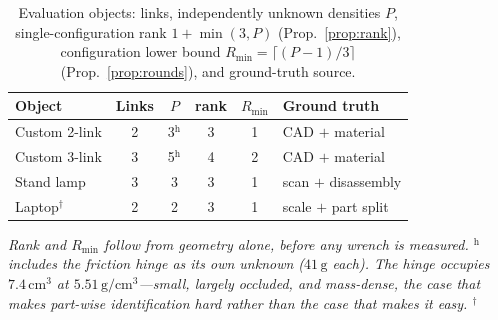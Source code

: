 \begin{table}[t]
\caption{Evaluation objects: links, independently unknown densities $P$,
single-configuration rank $1+\min(3,P)$ (Prop.~\ref{prop:rank}), configuration
lower bound $R_{\min}=\lceil (P-1)/3\rceil$ (Prop.~\ref{prop:rounds}), and
ground-truth source.}
\label{tab:objects}
\centering
\footnotesize
\setlength{\tabcolsep}{4pt}
\begin{tabular}{lccccl}
\toprule
Object & Links & $P$ & rank & $R_{\min}$ & Ground truth \\
\midrule
Custom 2-link  & 2 & 3$^{\mathrm h}$ & 3 & 1 & CAD $+$ material \\
Custom 3-link  & 3 & 5$^{\mathrm h}$ & 4 & 2 & CAD $+$ material \\
Stand lamp     & 3 & 3 & 3 & 1 & scan $+$ disassembly \\
Laptop$^{\dagger}$ & 2 & 2 & 3 & 1 & scale $+$ part split \\
\bottomrule
\end{tabular}
\vspace{2pt}
\parbox{\linewidth}{\footnotesize \textit{Rank and $R_{\min}$ follow from
geometry alone, before any wrench is measured. $^{\mathrm h}$ includes the friction hinge
as its own unknown ($41\,\mathrm{g}$ each). The hinge occupies $7.4\,\mathrm{cm^3}$ at
$5.51\,\mathrm{g/cm^3}$---small, largely occluded, and mass-dense, the case that makes
part-wise identification hard rather than the case that makes it easy.
$^{\dagger}$ }}
\end{table}
